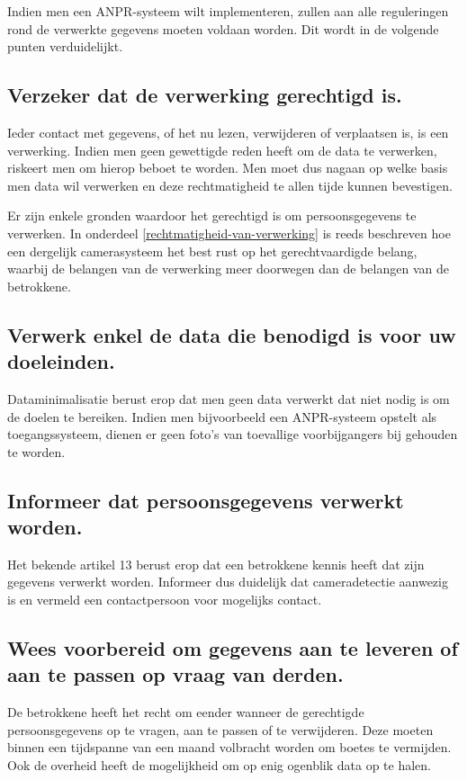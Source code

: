 Indien men een ANPR-systeem wilt implementeren, zullen aan alle reguleringen rond de verwerkte gegevens moeten voldaan worden. Dit wordt in de volgende punten verduidelijkt.

\subsection{Verzeker dat de verwerking gerechtigd is.}
Ieder contact met gegevens, of het nu lezen, verwijderen of verplaatsen is, is een verwerking. Indien men geen gewettigde reden heeft om de data te verwerken, riskeert men om hierop beboet te worden. Men moet dus nagaan op welke basis men data wil verwerken en deze rechtmatigheid te allen tijde kunnen bevestigen.

Er zijn enkele gronden waardoor het gerechtigd is om persoonsgegevens te verwerken. In onderdeel \ref{rechtmatigheid-van-verwerking} is reeds beschreven hoe een dergelijk camerasysteem het best rust op het gerechtvaardigde belang, waarbij de belangen van de verwerking meer doorwegen dan de belangen van de betrokkene. 

\subsection{Verwerk enkel de data die benodigd is voor uw doeleinden.}
Dataminimalisatie berust erop dat men geen data verwerkt dat niet nodig is om de doelen te bereiken. Indien men bijvoorbeeld een ANPR-systeem opstelt als toegangssysteem, dienen er geen foto's van toevallige voorbijgangers bij gehouden te worden.

\subsection{Informeer dat persoonsgegevens verwerkt worden.}
Het bekende artikel 13 berust erop dat een betrokkene kennis heeft dat zijn gegevens verwerkt worden. Informeer dus duidelijk dat cameradetectie aanwezig is en vermeld een contactpersoon voor mogelijks contact.

\subsection{Wees voorbereid om gegevens aan te leveren of aan te passen op vraag van derden.}

De betrokkene heeft het recht om eender wanneer de gerechtigde persoonsgegevens op te vragen, aan te passen of te verwijderen. Deze moeten binnen een tijdspanne van een maand volbracht worden om boetes te vermijden.
Ook de overheid heeft de mogelijkheid om op enig ogenblik data op te halen.

